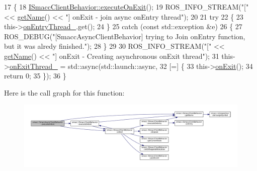 \begin{DoxyCode}
17     \{
18         \hyperlink{classsmacc_1_1ISmaccClientBehavior_ac88fbad78c928b4bca6d18659ddfd8c0}{ISmaccClientBehavior::executeOnExit}();
19         ROS\_INFO\_STREAM(\textcolor{stringliteral}{"["} << \hyperlink{classsmacc_1_1ISmaccClientBehavior_a18e4bec9460b010f2894c0f7e7064a34}{getName}() << \textcolor{stringliteral}{"] onExit - join async onEntry thread"});
20 
21         \textcolor{keywordflow}{try}
22         \{
23             this->\hyperlink{classsmacc_1_1SmaccAsyncClientBehavior_a6346e036a68f41c4397d7336f8519645}{onEntryThread\_}.get();
24         \}
25         \textcolor{keywordflow}{catch} (\textcolor{keyword}{const} std::exception &e)
26         \{
27             ROS\_DEBUG(\textcolor{stringliteral}{"[SmaccAsyncClientBehavior] trying to Join onEntry function, but it was alredy
       finished."});
28         \}
29 
30         ROS\_INFO\_STREAM(\textcolor{stringliteral}{"["} << \hyperlink{classsmacc_1_1ISmaccClientBehavior_a18e4bec9460b010f2894c0f7e7064a34}{getName}() << \textcolor{stringliteral}{"] onExit - Creating asynchronous onExit thread"});
31         this->\hyperlink{classsmacc_1_1SmaccAsyncClientBehavior_af76d1c36b4a10425f2da043545b73299}{onExitThread\_} = std::async(std::launch::async,
32             [=] \{
33                 this->\hyperlink{classsmacc_1_1ISmaccClientBehavior_a36bf771905e3bf750909a15e4215a9b3}{onExit}();
34                 \textcolor{keywordflow}{return} 0;
35             \});
36     \}
\end{DoxyCode}
Here is the call graph for this function\+:
\nopagebreak
\begin{figure}[H]
\begin{center}
\leavevmode
\includegraphics[width=350pt]{classsmacc_1_1SmaccAsyncClientBehavior_a3d982d370df4f133ad37c0b2370e9b82_cgraph}
\end{center}
\end{figure}
\mbox{\label{classsmacc_1_1SmaccAsyncClientBehavior_a85bf707ed4fc349e0e35d89c9e78bc54}} 
